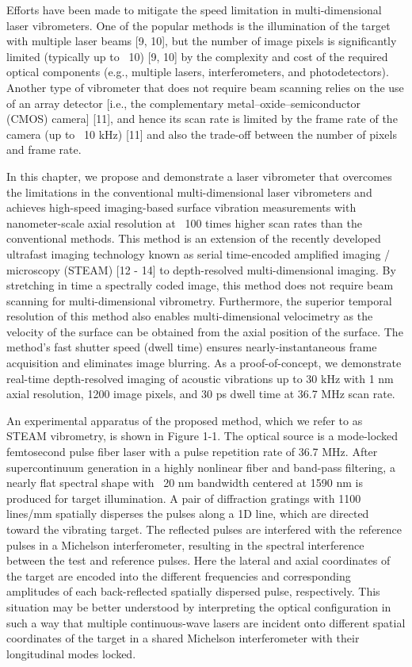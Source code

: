 Efforts have been made to mitigate the speed limitation in multi-dimensional laser vibrometers. One of the popular methods is the illumination of the target with multiple laser beams [9, 10], but the number of image pixels is significantly limited (typically up to ~10) [9, 10] by the complexity and cost of the required optical components (e.g., multiple lasers, interferometers, and photodetectors). Another type of vibrometer that does not require beam scanning relies on the use of an array detector [i.e., the complementary metal–oxide–semiconductor (CMOS) camera] [11], and hence its scan rate is limited by the frame rate of the camera (up to ~10 kHz) [11] and also the trade-off between the number of pixels and frame rate.

In this chapter, we propose and demonstrate a laser vibrometer that overcomes the limitations in the conventional multi-dimensional laser vibrometers and achieves high-speed imaging-based surface vibration measurements with nanometer-scale axial resolution at ~100 times higher scan rates than the conventional methods. This method is an extension of the recently developed ultrafast imaging technology known as serial time-encoded amplified imaging / microscopy (STEAM) [12 - 14] to depth-resolved multi-dimensional imaging. By stretching in time a spectrally coded image, this method does not require beam scanning for multi-dimensional vibrometry. Furthermore, the superior temporal resolution of this method also enables multi-dimensional velocimetry as the velocity of the surface can be obtained from the axial position of the surface. The method’s fast shutter speed (dwell time) ensures nearly-instantaneous frame acquisition and eliminates image blurring. As a proof-of-concept, we demonstrate real-time depth-resolved imaging of acoustic vibrations up to 30 kHz with 1 nm axial resolution, 1200 image pixels, and 30 ps dwell time at 36.7 MHz scan rate.

An experimental apparatus of the proposed method, which we refer to as STEAM vibrometry, is shown in Figure 1-1. The optical source is a mode-locked femtosecond pulse fiber laser with a pulse repetition rate of 36.7 MHz. After supercontinuum generation in a highly nonlinear fiber and band-pass filtering, a nearly flat spectral shape with ~20 nm bandwidth centered at 1590 nm is produced for target illumination. A pair of diffraction gratings with 1100 lines/mm spatially disperses the pulses along a 1D line, which are directed toward the vibrating target. The reflected pulses are interfered with the reference pulses in a Michelson interferometer, resulting in the spectral interference between the test and reference pulses. Here the lateral and axial coordinates of the target are encoded into the different frequencies and corresponding amplitudes of each back-reflected spatially dispersed pulse, respectively. This situation may be better understood by interpreting the optical configuration in such a way that multiple continuous-wave lasers are incident onto different spatial coordinates of the target in a shared Michelson interferometer with their longitudinal modes locked.

